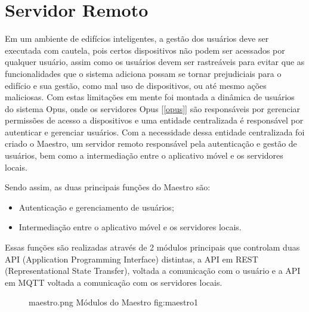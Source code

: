 \section{Servidor Remoto}
\label{chap:maestro}
Em um ambiente de edifícios inteligentes, a gestão dos usuários deve ser executada com cautela, pois certos dispositivos não podem
ser acessados por qualquer usuário, assim como os usuários devem ser rastreáveis para evitar que as funcionalidades que o sistema adiciona
possam se tornar prejudiciais para o edifício e sua gestão, como mal uso de dispositivos, ou até mesmo ações maliciosas. Com estas limitações
em mente foi montada a dinâmica de usuários do sistema Opus, onde os servidores Opus [\ref{opus}] são responsáveis por gerenciar permissões
de acesso a dispositivos e uma entidade centralizada é responsável por autenticar e gerenciar usuários. Com a necessidade dessa entidade centralizada
foi criado o Maestro, um servidor remoto responsável pela autenticação e gestão de usuários, bem como a intermediação entre o aplicativo móvel e 
os servidores locais.

Sendo assim, as duas principais funções do Maestro são:
\begin{itemize}
    \item Autenticação e gerenciamento de usuários;
    \item Intermediação entre o aplicativo móvel e os servidores locais.
\end{itemize}
Essas funções são realizadas através de 2 módulos principais que controlam duas API (Application Programming Interface) distintas, a API em 
REST (Representational State Transfer), voltada a comunicação com o usuário e a API em MQTT voltada a comunicação com os servidores locais.

\begin{figure}[h!]
    {maestro.png}
    {Módulos do Maestro}
    {fig:maestro1}
\end{figure}


